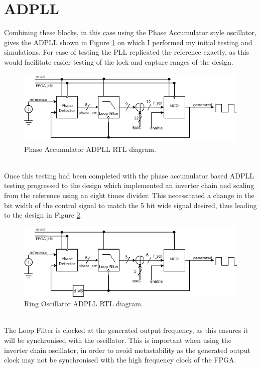 \documentclass[11pt,english,british]{report}
\begin{document}
\section{ADPLL}
Combining these blocks, in this case using the Phase Accumulator style oscillator, gives the ADPLL shown in Figure \ref{fig:my_adpll} on which I performed my initial testing and simulations. For ease of testing the PLL replicated the reference exactly, as this would facilitate easier testing of the lock and capture ranges of the design.
\begin{figure}[h]
	\centering
	\includegraphics[scale=0.275]{../rtl}
	\caption{Phase Accumulator ADPLL RTL diagram.}
	\label{fig:my_adpll}
\end{figure}\\
Once this testing had been completed with the phase accumulator based ADPLL testing progressed to the design which implemented an inverter chain and scaling from the reference using an eight times divider. This necessitated a change in the bit width of the control signal to match the 5 bit wide signal desired, thus leading to the design in Figure \ref{fig:my_ring_adpll}.
\begin{figure}[h]
	\centering
	\includegraphics[scale=0.275]{../ro_rtl}
	\caption{Ring Oscillator ADPLL RTL diagram.}
	\label{fig:my_ring_adpll}
\end{figure}\\
 The Loop Filter is clocked at the generated output frequency, as this ensures it will be synchronised with the oscillator. This is important when using the inverter chain oscillator, in order to avoid metastability as the generated output clock may not be synchronised with the high frequency clock of the FPGA.
\end{document}
